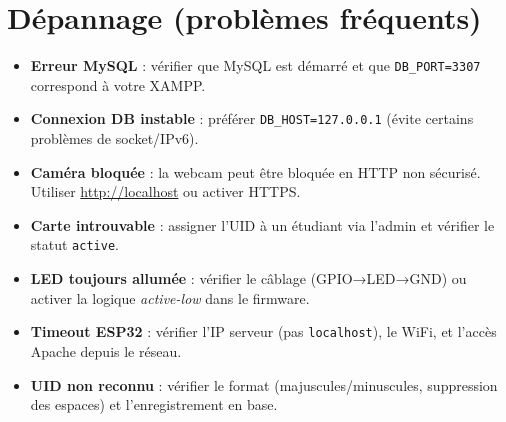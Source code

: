 \documentclass[11pt,a4paper]{article}
\begin{document}
\section{Dépannage (problèmes fréquents)}
\begin{itemize}
  \item \textbf{Erreur MySQL} : vérifier que MySQL est démarré et que \texttt{DB\_PORT=3307} correspond à votre XAMPP.
  \item \textbf{Connexion DB instable} : préférer \texttt{DB\_HOST=127.0.0.1} (évite certains problèmes de socket/IPv6).
  \item \textbf{Caméra bloquée} : la webcam peut être bloquée en HTTP non sécurisé. Utiliser \url{http://localhost} ou activer HTTPS.
  \item \textbf{Carte introuvable} : assigner l’UID à un étudiant via l’admin et vérifier le statut \texttt{active}.
  \item \textbf{LED toujours allumée} : vérifier le câblage (GPIO→LED→GND) ou activer la logique \textit{active-low} dans le firmware.
  \item \textbf{Timeout ESP32} : vérifier l’IP serveur (pas \texttt{localhost}), le WiFi, et l’accès Apache depuis le réseau.
  \item \textbf{UID non reconnu} : vérifier le format (majuscules/minuscules, suppression des espaces) et l’enregistrement en base.
\end{itemize}
\end{document}
